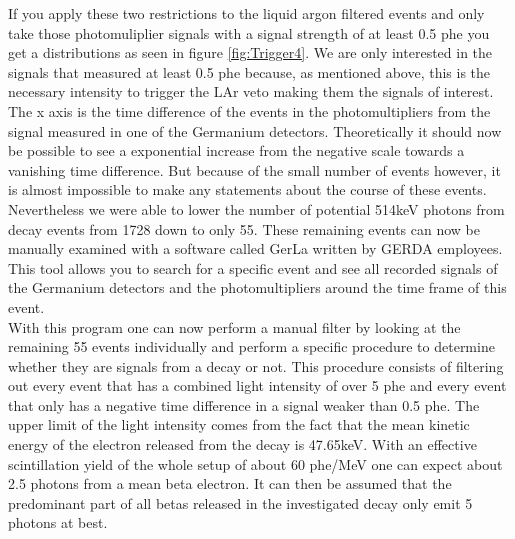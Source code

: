 If you apply these two restrictions to the liquid argon filtered events and only take those photomuliplier signals with a signal strength of at least 0.5 phe you get a distributions as seen in figure \ref{fig:Trigger4}.
We are only interested in the signals that measured at least 0.5 phe because, as mentioned above, this is the necessary intensity to trigger the LAr veto making them the signals of interest. 
The x axis is the time difference of the events in the photomultipliers from the signal measured in one of the Germanium detectors.
Theoretically it should now be possible to see a exponential increase from the negative scale towards a vanishing time difference.
But because of the small number of events however, it is almost impossible to make any statements about the course of these events.
\\

Nevertheless we were able to lower the number of potential 514keV photons from \Kr decay events from 1728 down to only 55.  
These remaining events can now be manually examined with a software called GerLa written by GERDA employees.
This tool allows you to search for a specific event and see all recorded signals of the Germanium detectors and the photomultipliers around the time frame of this event.
\\

With this program one can now perform a manual filter by looking at the remaining 55 events individually and perform a specific procedure to determine whether they are signals from a \Kr decay or not.
This procedure consists of filtering out every event that has a combined light intensity of over 5 phe and every event that only has a negative time difference in a signal weaker than 0.5 phe.
The upper limit of the light intensity comes from the fact that the mean kinetic energy of the electron released from the decay is 47.65keV.
With an effective scintillation yield of the whole setup of about 60 phe/MeV one can expect about 2.5 photons from a mean beta electron. 
It can then be assumed that the predominant part of all betas released in the investigated decay only emit 5 photons at best.
\\


